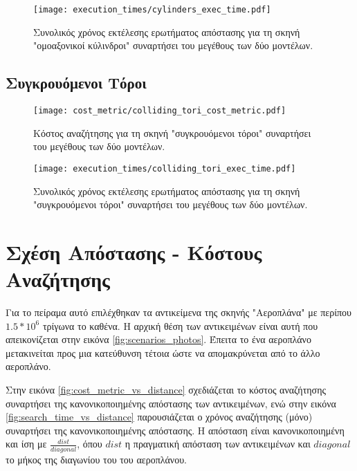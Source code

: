 \begin{figure}[H]
    \centering
    \texttt{[image: execution\_times/cylinders\_exec\_time.pdf]}
    \caption[Συνολικός Χρόνος Εκτέλεσης για "ομοαξονικοί κύλινδροι"] {
        Συνολικός χρόνος εκτέλεσης ερωτήματος απόστασης 
        για τη σκηνή "ομοαξονικοί κύλινδροι" συναρτήσει του μεγέθους των δύο μοντέλων.
    }
\end{figure}

\subsection{Συγκρουόμενοι Τόροι}
\begin{figure}[H]
    \centering
    \texttt{[image: cost\_metric/colliding\_tori\_cost\_metric.pdf]}
    \caption[Κόστος Αναζήτησης για "συγκρουόμενοι τόροι"] {
        Κόστος αναζήτησης για τη σκηνή "συγκρουόμενοι τόροι" συναρτήσει 
        του μεγέθους των δύο μοντέλων.
    }
\end{figure}

\begin{figure}[H]
    \centering
    \texttt{[image: execution\_times/colliding\_tori\_exec\_time.pdf]}
    \caption[Συνολικός Χρόνος Εκτέλεσης για "συγκρουόμενοι τόροι"] {
        Συνολικός χρόνος εκτέλεσης ερωτήματος απόστασης 
        για τη σκηνή "συγκρουόμενοι τόροι" συναρτήσει του μεγέθους των δύο μοντέλων.
    }
\end{figure}


\section{Σχέση Απόστασης - Κόστους Αναζήτησης}
Για το πείραμα αυτό επιλέχθηκαν τα αντικείμενα της σκηνής 
"Αεροπλάνα" με περίπου $1.5 * 10^6$ τρίγωνα το καθένα.
Η αρχική θέση των αντικειμένων είναι αυτή που απεικονίζεται 
στην εικόνα \ref{fig:scenarios_photos}.
Έπειτα το ένα αεροπλάνο μετακινείται 
προς μια κατεύθυνση τέτοια ώστε να απομακρύνεται 
από το άλλο αεροπλάνο.

Στην εικόνα \ref{fig:cost_metric_vs_distance} 
σχεδιάζεται το κόστος αναζήτησης συναρτήσει της 
κανονικοποιημένης απόστασης των αντικειμένων, 
ενώ στην εικόνα \ref{fig:search_time_vs_distance} 
παρουσιάζεται ο χρόνος αναζήτησης (μόνο) συναρτήσει 
της κανονικοποιημένης απόστασης. 
Η απόσταση είναι κανονικοποιημένη και ίση με 
$\frac{dist}{diagonal}$, όπου $dist$ η πραγματική 
απόσταση των αντικειμένων και $diagonal$ το μήκος 
της διαγωνίου του  του αεροπλάνου.


